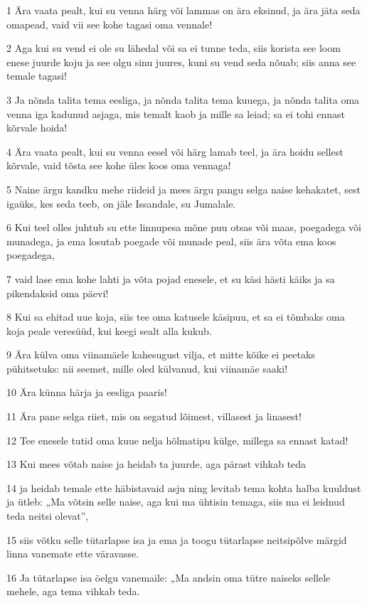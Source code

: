 \par 1 Ära vaata pealt, kui su venna härg või lammas on ära eksinud, ja ära jäta seda omapead, vaid vii see kohe tagasi oma vennale!
\par 2 Aga kui su vend ei ole su lähedal või sa ei tunne teda, siis korista see loom enese juurde koju ja see olgu sinu juures, kuni su vend seda nõuab; siis anna see temale tagasi!
\par 3 Ja nõnda talita tema eesliga, ja nõnda talita tema kuuega, ja nõnda talita oma venna iga kadunud asjaga, mis temalt kaob ja mille sa leiad; sa ei tohi ennast kõrvale hoida!
\par 4 Ära vaata pealt, kui su venna eesel või härg lamab teel, ja ära hoidu sellest kõrvale, vaid tõsta see kohe üles koos oma vennaga!
\par 5 Naine ärgu kandku mehe riideid ja mees ärgu pangu selga naise kehakatet, sest igaüks, kes seda teeb, on jäle Issandale, su Jumalale.
\par 6 Kui teel olles juhtub su ette linnupesa mõne puu otsas või maas, poegadega või munadega, ja ema losutab poegade või munade peal, siis ära võta ema koos poegadega,
\par 7 vaid lase ema kohe lahti ja võta pojad enesele, et su käsi hästi käiks ja sa pikendaksid oma päevi!
\par 8 Kui sa ehitad uue koja, siis tee oma katusele käsipuu, et sa ei tõmbaks oma koja peale veresüüd, kui keegi sealt alla kukub.
\par 9 Ära külva oma viinamäele kahesugust vilja, et mitte kõike ei peetaks pühitsetuks: nii seemet, mille oled külvanud, kui viinamäe saaki!
\par 10 Ära künna härja ja eesliga paaris!
\par 11 Ära pane selga riiet, mis on segatud lõimest, villasest ja linasest!
\par 12 Tee enesele tutid oma kuue nelja hõlmatipu külge, millega sa ennast katad!
\par 13 Kui mees võtab naise ja heidab ta juurde, aga pärast vihkab teda
\par 14 ja heidab temale ette häbistavaid asju ning levitab tema kohta halba kuuldust ja ütleb: „Ma võtsin selle naise, aga kui ma ühtisin temaga, siis ma ei leidnud teda neitsi olevat”,
\par 15 siis võtku selle tütarlapse isa ja ema ja toogu tütarlapse neitsipõlve märgid linna vanemate ette väravasse.
\par 16 Ja tütarlapse isa öelgu vanemaile: „Ma andsin oma tütre naiseks sellele mehele, aga tema vihkab teda.
